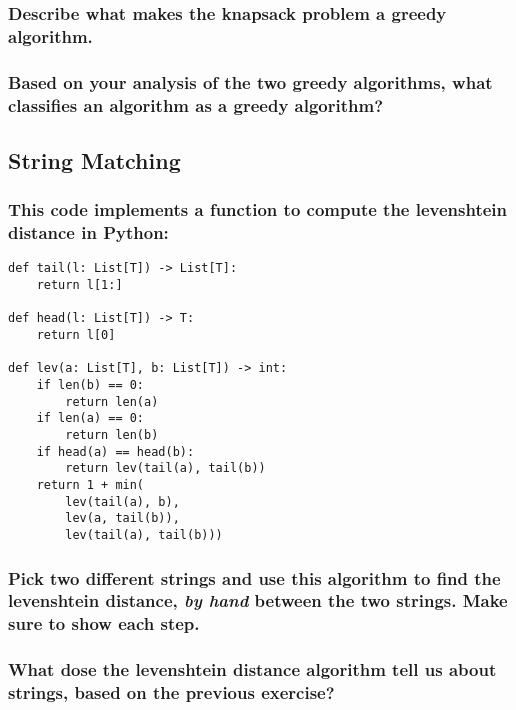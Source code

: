 \documentclass{article}
\begin{document}
\vspace{24pt}

\subsubsection{Describe what makes the knapsack problem a greedy algorithm.}

\vspace{144pt}

\subsubsection{Based on your analysis of the two greedy algorithms, what classifies an algorithm as a greedy algorithm?}

\pagebreak{}

\begin{Large}
\subsection{\textbf{String Matching}}
\end{Large}

\subsubsection{This code implements a function to compute the levenshtein distance in Python:}

\begin{lstlisting}
def tail(l: List[T]) -> List[T]:
    return l[1:]

def head(l: List[T]) -> T:
    return l[0]

def lev(a: List[T], b: List[T]) -> int:
    if len(b) == 0:
        return len(a)
    if len(a) == 0:
        return len(b)
    if head(a) == head(b):
        return lev(tail(a), tail(b))
    return 1 + min(
        lev(tail(a), b),
        lev(a, tail(b)),
        lev(tail(a), tail(b)))
\end{lstlisting}

\subsubsection{Pick two different strings and use this algorithm to find the levenshtein distance, \textit{by hand} between the two strings. Make sure to show each step.}

\vspace{72pt}

\subsubsection{What dose the levenshtein distance algorithm tell us about strings, based on the previous exercise?}

\pagebreak{}
\end{document}
